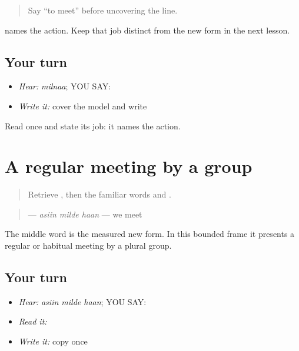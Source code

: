 \begin{quote}
Say “to meet” before uncovering the line.
\end{quote}

\begin{grammarlens}[title={Grammar Lens}]
\textbf{} names the action. Keep that job distinct from the new form in the next lesson.
\end{grammarlens}

\subsection*{Your turn}
\begin{itemize}
\raggedright
  \item \emph{Hear:} \emph{milnaa}; YOU SAY: \textbf{}
  \item \emph{Write it:} cover the model and write \textbf{}
\end{itemize}

\begin{tcolorbox}[breakable,colback=teal!4,colframe=teal!35!black,title={Before you move on}]
Read \textbf{} once and state its job: it names the action.
\end{tcolorbox}
\section[\texorpdfstring{\pa{ਅਸੀਂ} \pa{ਮਿਲਦੇ} \pa{ਹਾਂ} (asiin milde haan)}{ਅਸੀਂ ਮਿਲਦੇ ਹਾਂ (asiin milde haan)}]{A regular meeting by a group}

\label{lesson:PA-C188-milde}



\begin{quote}
Retrieve \textbf{}, then the familiar words \textbf{} and \textbf{}.
\end{quote}

\begin{grammarlens}[title={Grammar Lens: the regular-group form}]
\begin{quote}
\textbf{  } — \emph{asiin milde haan} — we meet
\end{quote}

The middle word is the measured new form. In this bounded frame it presents a regular or habitual meeting by a plural group.
\end{grammarlens}

\subsection*{Your turn}
\begin{itemize}
\raggedright
  \item \emph{Hear:} \emph{asiin milde haan}; YOU SAY: \textbf{  }
  \item \emph{Read it:} \textbf{  }
  \item \emph{Write it:} copy \textbf{} once
\end{itemize}

